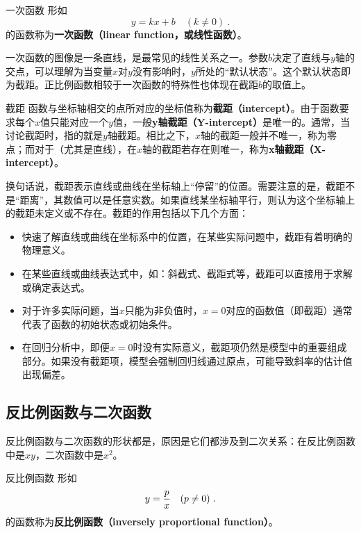 \begin{definition}{一次函数}
形如
\begin{equation}
y = kx+b\quad(k\neq0)~.
\end{equation}
的函数称为\textbf{一次函数（linear function，或线性函数）}。
\end{definition}

一次函数的图像是一条直线，是最常见的线性关系之一。参数$b$决定了直线与$y$轴的交点，可以理解为当变量$x$对$y$没有影响时，$y$所处的“默认状态”。这个默认状态即为截距。正比例函数相较于一次函数的特殊性也体现在截距$b$的取值上。

\begin{definition}{截距}
函数与坐标轴相交的点所对应的坐标值称为\textbf{截距（intercept）}。由于函数要求每个$x$值只能对应一个$y$值，一般\textbf{y轴截距（Y-intercept）}是唯一的。通常，当讨论截距时，指的就是$y$轴截距。相比之下，$x$轴的截距一般并不唯一，称为零点；而对于（尤其是直线），在$x$轴的截距若存在则唯一，称为\textbf{x轴截距（X-intercept）}。
\end{definition}

换句话说，截距表示直线或曲线在坐标轴上“停留”的位置。需要注意的是，截距不是“距离”，其数值可以是任意实数。如果直线某坐标轴平行，则认为这个坐标轴上的截距未定义或不存在。截距的作用包括以下几个方面：
\begin{itemize}
\item 快速了解直线或曲线在坐标系中的位置，在某些实际问题中，截距有着明确的物理意义。
\item 在某些直线或曲线表达式中，如：斜截式、截距式等，截距可以直接用于求解或确定表达式。
\item 对于许多实际问题，当$x$只能为非负值时，$x=0$对应的函数值（即截距）通常代表了函数的初始状态或初始条件。
\item 在回归分析中，即便$x=0$时没有实际意义，截距项仍然是模型中的重要组成部分。如果没有截距项，模型会强制回归线通过原点，可能导致斜率的估计值出现偏差。
\end{itemize}

\subsection{反比例函数与二次函数}

反比例函数与二次函数的形状都是，原因是它们都涉及到二次关系：在反比例函数中是$xy$，二次函数中是$x^2$。

\begin{definition}{反比例函数}
形如
\begin{equation}
y={p\over x}\quad(p\neq0)~.
\end{equation}
的函数称为\textbf{反比例函数（inversely proportional function）}。
\end{definition}

